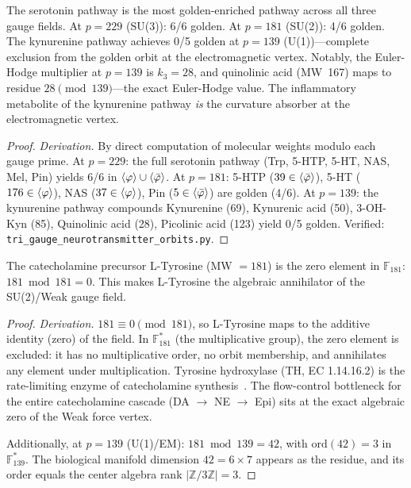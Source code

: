\begin{theorem}
\label{thm:serotonin_golden}
The serotonin pathway is the most golden-enriched pathway across all three gauge fields. At $p = 229$ (SU(3)): 6/6 golden. At $p = 181$ (SU(2)): 4/6 golden. The kynurenine pathway achieves 0/5 golden at $p = 139$ (U(1))---complete exclusion from the golden orbit at the electromagnetic vertex. Notably, the Euler-Hodge multiplier at $p = 139$ is $k_3 = 28$, and quinolinic acid (MW~167) maps to residue $28 \pmod{139}$---the exact Euler-Hodge value. The inflammatory metabolite of the kynurenine pathway \emph{is} the curvature absorber at the electromagnetic vertex.
\begin{proof}
\emph{Derivation.} By direct computation of molecular weights modulo each gauge prime. At $p=229$: the full serotonin pathway (Trp, 5-HTP, 5-HT, NAS, Mel, Pin) yields 6/6 in $\langle\varphi\rangle \cup \langle\bar{\varphi}\rangle$. At $p=181$: 5-HTP ($39 \in \langle\bar{\varphi}\rangle$), 5-HT ($176 \in \langle\varphi\rangle$), NAS ($37 \in \langle\varphi\rangle$), Pin ($5 \in \langle\bar{\varphi}\rangle$) are golden (4/6). At $p=139$: the kynurenine pathway compounds Kynurenine (69), Kynurenic acid (50), 3-OH-Kyn (85), Quinolinic acid (28), Picolinic acid (123) yield 0/5 golden. Verified: \texttt{tri\_gauge\_neurotransmitter\_orbits.py}.
\qedhere
\end{proof}
\end{theorem}

\begin{theorem}
\label{thm:tyrosine_annihilation}
The catecholamine precursor L-Tyrosine (MW $= 181$) is the zero element in $\mathbb{F}_{181}$: $181 \bmod 181 = 0$. This makes L-Tyrosine the algebraic annihilator of the SU(2)/Weak gauge field.
\begin{proof}
\emph{Derivation.} $181 \equiv 0 \pmod{181}$, so L-Tyrosine maps to the additive identity (zero) of the field. In $\mathbb{F}_{181}^*$ (the multiplicative group), the zero element is excluded: it has no multiplicative order, no orbit membership, and annihilates any element under multiplication. Tyrosine hydroxylase (TH, EC 1.14.16.2) is the rate-limiting enzyme of catecholamine synthesis~\cite{nagatsu64}. The flow-control bottleneck for the entire catecholamine cascade (DA $\to$ NE $\to$ Epi) sits at the exact algebraic zero of the Weak force vertex.

Additionally, at $p = 139$ (U(1)/EM): $181 \bmod 139 = 42$, with $\mathrm{ord}(42) = 3$ in $\mathbb{F}_{139}^*$. The biological manifold dimension $42 = 6 \times 7$ appears as the residue, and its order equals the center algebra rank $|\mathbb{Z}/3\mathbb{Z}| = 3$.
\qedhere
\end{proof}
\end{theorem}

